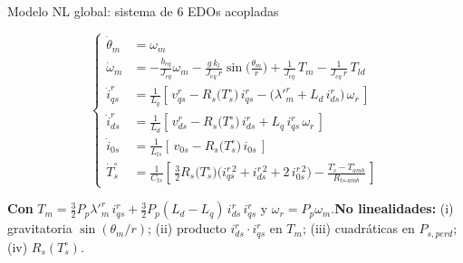 \documentclass[aspectratio=169,t]{beamer}
\begin{document}
\begin{frame}{Modelo NL global: sistema de 6 EDOs acopladas}
\vspace{2mm}

\footnotesize
\begin{equation*}
\left\{
\begin{aligned}
\dot{\theta}_m &= \omega_m \\[1pt]
\dot{\omega}_m &= -\tfrac{b_{eq}}{J_{eq}}\omega_m - \tfrac{g\,k_l}{J_{eq}\,r}\sin\!\big(\tfrac{\theta_m}{r}\big) + \tfrac{1}{J_{eq}}\,T_m - \tfrac{1}{J_{eq}\,r}\,T_{ld} \\[1pt]
\dot{i}_{qs}^{r} &= \tfrac{1}{L_q}\!\left[\,v_{qs}^{r} - R_s\!\big(T_s^\circ\big)\, i_{qs}^{r} - \big(\lambda'^r_m + L_d\,i_{ds}^{r}\big)\,\omega_r\,\right] \\[1pt]
\dot{i}_{ds}^{r} &= \tfrac{1}{L_d}\!\left[\,v_{ds}^{r} - R_s\!\big(T_s^\circ\big)\, i_{ds}^{r} + L_q\,i_{qs}^{r}\,\omega_r\,\right] \\[1pt]
\dot{i}_{0s} &= \tfrac{1}{L_{ls}}\!\left[\,v_{0s} - R_s\!\big(T_s^\circ\big)\, i_{0s}\,\right] \\[1pt]
\dot{T}_s^\circ &= \tfrac{1}{C_{ts}}\!\left[\,\tfrac{3}{2}R_s\!\big(T_s^\circ\big)\big(i_{qs}^{r\,2}+i_{ds}^{r\,2}+2\,i_{0s}^{r\,2}\big) - \tfrac{T_s^\circ - T_{amb}^\circ}{R_{ts\text{-}amb}}\,\right]
\end{aligned}\right.
\end{equation*}
\normalsize

\vspace{1mm}
{\small \textbf{Con} $T_m = \tfrac{3}{2}P_p\lambda'^r_m\,i_{qs}^{r} + \tfrac{3}{2}P_p(L_d-L_q)\,i_{ds}^{r}\,i_{qs}^{r}$ \;y\; $\omega_r = P_p\omega_m$.\quad \textbf{No linealidades:} (i) gravitatoria $\sin(\theta_m/r)$; (ii) producto $i_{ds}^{r}\!\cdot\! i_{qs}^{r}$ en $T_m$; (iii) cuadráticas en $P_{s,perd}$; (iv) $R_s(T_s^\circ)$.}
\end{frame}
\end{document}
